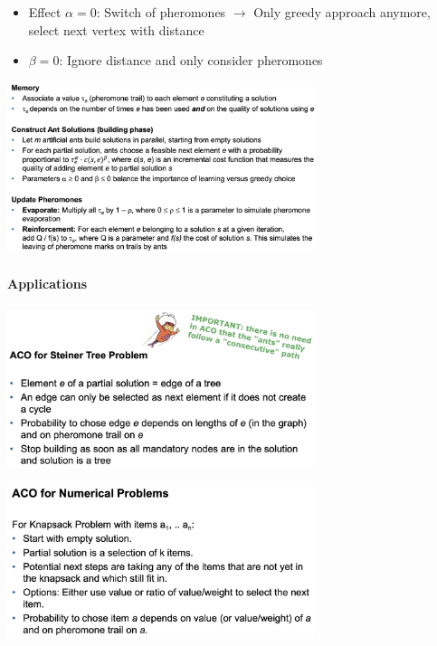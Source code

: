 \documentclass[10pt,a4paper,twocolumn]{article}
\begin{document}
\begin{itemize}
	\item Effect $\alpha = 0$: Switch of pheromones $\rightarrow$ Only greedy approach anymore, select next vertex with distance
	\item $\beta = 0$: Ignore distance and only consider pheromones
\end{itemize}

\begin{center}
	\includegraphics[width=9cm]{images/aco-description}
\end{center}

\paragraph{Applications}

\begin{center}
	\includegraphics[width=9cm]{images/steiner-aco}
\end{center}

\begin{center}
	\includegraphics[width=9cm]{images/numeric-aco}
\end{center}
\end{document}
